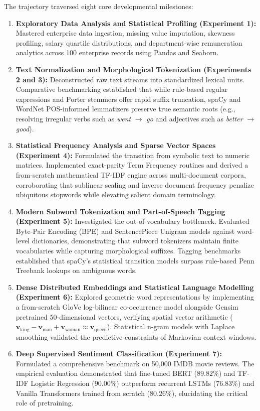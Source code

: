 The trajectory traversed eight core developmental milestones:
\begin{enumerate}
    \item \textbf{Exploratory Data Analysis and Statistical Profiling (Experiment 1):} Mastered enterprise data ingestion, missing value imputation, skewness profiling, salary quartile distributions, and department-wise remuneration analytics across 100 enterprise records using Pandas and Seaborn.
    \item \textbf{Text Normalization and Morphological Tokenization (Experiments 2 and 3):} Deconstructed raw text streams into standardized lexical units. Comparative benchmarking established that while rule-based regular expressions and Porter stemmers offer rapid suffix truncation, spaCy and WordNet POS-informed lemmatizers preserve true semantic roots (e.g., resolving irregular verbs such as \textit{went} $\to$ \textit{go} and adjectives such as \textit{better} $\to$ \textit{good}).
    \item \textbf{Statistical Frequency Analysis and Sparse Vector Spaces (Experiment 4):} Formulated the transition from symbolic text to numeric matrices. Implemented exact-parity Term Frequency routines and derived a from-scratch mathematical TF-IDF engine across multi-document corpora, corroborating that sublinear scaling and inverse document frequency penalize ubiquitous stopwords while elevating salient domain terminology.
    \item \textbf{Modern Subword Tokenization and Part-of-Speech Tagging (Experiment 5):} Investigated the out-of-vocabulary bottleneck. Evaluated Byte-Pair Encoding (BPE) and SentencePiece Unigram models against word-level dictionaries, demonstrating that subword tokenizers maintain finite vocabularies while capturing morphological suffixes. Tagging benchmarks established that spaCy's statistical transition models surpass rule-based Penn Treebank lookups on ambiguous words.
    \item \textbf{Dense Distributed Embeddings and Statistical Language Modelling (Experiment 6):} Explored geometric word representations by implementing a from-scratch GloVe log-bilinear co-occurrence model alongside Gensim pretrained 50-dimensional vectors, verifying spatial vector arithmetic ($\mathbf{v}_{\text{king}} - \mathbf{v}_{\text{man}} + \mathbf{v}_{\text{woman}} \approx \mathbf{v}_{\text{queen}}$). Statistical n-gram models with Laplace smoothing validated the predictive constraints of Markovian context windows.
    \item \textbf{Deep Supervised Sentiment Classification (Experiment 7):} Formulated a comprehensive benchmark on 50,000 IMDB movie reviews. The empirical evaluation demonstrated that fine-tuned BERT ($\mathbf{89.82\%}$) and TF-IDF Logistic Regression ($\mathbf{90.00\%}$) outperform recurrent LSTMs ($\mathbf{76.83\%}$) and Vanilla Transformers trained from scratch ($\mathbf{80.26\%}$), elucidating the critical role of pretraining.

\end{enumerate}
